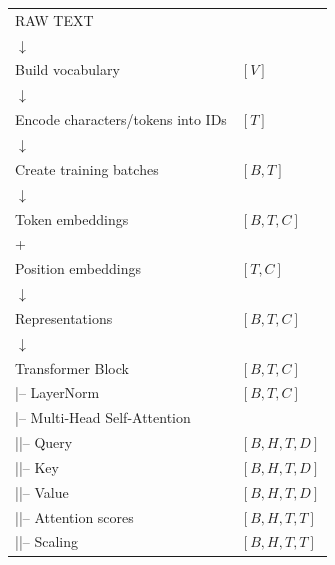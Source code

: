 \begingroup
\setlength{\parskip}{0pt}
\small\ttfamily
\begin{longtable}{@{}p{}@{}l@{}}
RAW TEXT & \\
\hspace*{2em}\(\downarrow\) & \\
Build vocabulary & \([V]\) \\
\hspace*{2em}\(\downarrow\) & \\
Encode characters/tokens into IDs & \([T]\) \\
\hspace*{2em}\(\downarrow\) & \\
Create training batches & \([B,T]\) \\
\hspace*{2em}\(\downarrow\) & \\
Token embeddings & \([B,T,C]\) \\
\hspace*{2em}+ & \\
Position embeddings & \([T,C]\) \\
\hspace*{2em}\(\downarrow\) & \\
Representations & \([B,T,C]\) \\
\hspace*{2em}\(\downarrow\) & \\
Transformer Block & \([B,T,C]\) \\
\hspace*{2em}|-- LayerNorm & \([B,T,C]\) \\
\hspace*{2em}|-- Multi-Head Self-Attention & \\
\hspace*{2em}|\hspace*{3em}|-- Query & \([B,H,T,D]\) \\
\hspace*{2em}|\hspace*{3em}|-- Key & \([B,H,T,D]\) \\
\hspace*{2em}|\hspace*{3em}|-- Value & \([B,H,T,D]\) \\
\hspace*{2em}|\hspace*{3em}|-- Attention scores & \([B,H,T,T]\) \\
\hspace*{2em}|\hspace*{3em}|-- Scaling & \([B,H,T,T]\) \\

\end{longtable}

